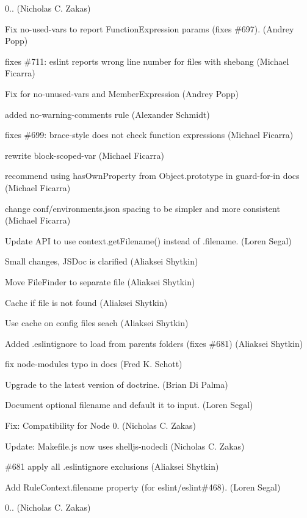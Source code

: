 \begin{DoxyItemize}
\item 0.. (Nicholas C. Zakas)
\item Fix no-\/used-\/vars to report Function\+Expression params (fixes \#697). (Andrey Popp)
\item fixes \#711\+: eslint reports wrong line number for files with shebang (Michael Ficarra)
\item Fix for no-\/unused-\/vars and Member\+Expression (Andrey Popp)
\item added no-\/warning-\/comments rule (Alexander Schmidt)
\item fixes \#699\+: brace-\/style does not check function expressions (Michael Ficarra)
\item rewrite block-\/scoped-\/var (Michael Ficarra)
\item recommend using has\+Own\+Property from Object.\+prototype in guard-\/for-\/in docs (Michael Ficarra)
\item change conf/environments.\+json spacing to be simpler and more consistent (Michael Ficarra)
\item Update A\+PI to use context.\+get\+Filename() instead of .filename. (Loren Segal)
\item Small changes, J\+S\+Doc is clarified (Aliaksei Shytkin)
\item Move File\+Finder to separate file (Aliaksei Shytkin)
\item Cache if file is not found (Aliaksei Shytkin)
\item Use cache on config files seach (Aliaksei Shytkin)
\item Added .eslintignore to load from parents folders (fixes \#681) (Aliaksei Shytkin)
\item fix \textquotesingle{}node-\/modules\textquotesingle{} typo in docs (Fred K. Schott)
\item Upgrade to the latest version of doctrine. (Brian Di Palma)
\item Document optional filename and default it to {\ttfamily input}. (Loren Segal)
\item Fix\+: Compatibility for Node 0. (Nicholas C. Zakas)
\item Update\+: Makefile.\+js now uses shelljs-\/nodecli (Nicholas C. Zakas)
\item \#681 apply all .eslintignore exclusions (Aliaksei Shytkin)
\item Add Rule\+Context.\+filename property (for eslint/eslint\#468). (Loren Segal)
\item 0.. (Nicholas C. Zakas)
\end{DoxyItemize}

